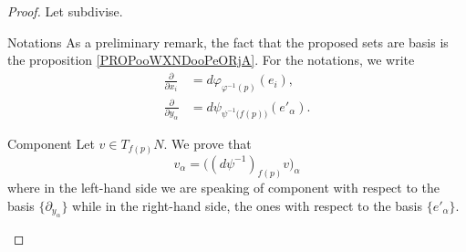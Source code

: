 \begin{proof}
    Let subdivise.
    \begin{subproof}
        \item[Notations]
            As a preliminary remark, the fact that the proposed sets are basis is the proposition \ref{PROPooWXNDooPeORjA}. For the notations, we write
            \begin{subequations}
                \begin{align}
                    \frac{ \partial  }{ \partial x_i }&=d\varphi_{\varphi^{-1}(p)}(e_i),\\
                    \frac{ \partial  }{ \partial y_{\alpha} }&=d\psi_{\psi^{-1}\big( f(p) \big)}(e'_{\alpha}).
                \end{align}
            \end{subequations}
        \item[Component]
            Let \( v\in T_{f(p)}N\). We prove that
            \begin{equation}        \label{EQooISXNooJOzUmS}
                v_{\alpha}=\Big( (d\psi^{-1})_{f(p)}v \Big)_{\alpha}
            \end{equation}
            where in the left-hand side we are speaking of component with respect to the basis \( \{ \partial_{y_{\alpha}} \}\) while in the right-hand side, the ones with respect to the basis \( \{ e'_{\alpha} \}\).


\end{subproof}
\end{proof}
